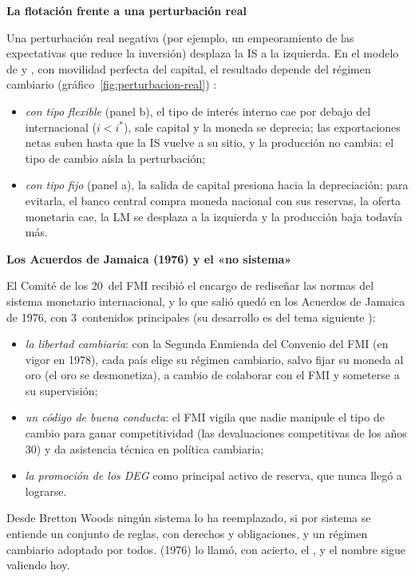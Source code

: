 \documentclass[11pt]{article}
\begin{document}
\begin{anotaciones}
\textbf{La flotación frente a una perturbación real}

Una perturbación real negativa (por ejemplo, un empeoramiento de las expectativas que reduce la inversión) desplaza la IS a la izquierda. En el modelo de  y , con movilidad perfecta del capital, el resultado depende del régimen cambiario (gráfico~\ref{fig:perturbacion-real})  :
\begin{itemize}
\item \emph{con tipo flexible} (panel b), el tipo de interés interno cae por debajo del internacional ($i<i^*$), sale capital y la moneda se deprecia; las exportaciones netas suben hasta que la IS vuelve a su sitio, y la producción no cambia: el tipo de cambio aísla la perturbación;
\item \emph{con tipo fijo} (panel a), la salida de capital presiona hacia la depreciación; para evitarla, el banco central compra moneda nacional con sus reservas, la oferta monetaria cae, la LM se desplaza a la izquierda y la producción baja todavía más.
\end{itemize}
\begin{figuracaja}
\caption{Una perturbación real negativa con tipo de cambio fijo y flexible}\label{fig:perturbacion-real}
\end{figuracaja}
\end{anotaciones}

\begin{anotaciones}
\textbf{Los Acuerdos de Jamaica (1976) y el «no sistema»}

El Comité de los 20~del FMI recibió el encargo de rediseñar las normas del sistema monetario internacional, y lo que salió quedó en los Acuerdos de Jamaica de 1976, con 3~contenidos principales (su desarrollo es del tema siguiente ):
\begin{itemize}
\item \emph{la libertad cambiaria}: con la Segunda Enmienda del Convenio del FMI (en vigor en 1978), cada país elige su régimen cambiario, salvo fijar su moneda al oro (el oro se desmonetiza), a cambio de colaborar con el FMI y someterse a su supervisión;
\item \emph{un código de buena conducta}: el FMI vigila que nadie manipule el tipo de cambio para ganar competitividad (las devaluaciones competitivas de los años 30) y da asistencia técnica en política cambiaria;
\item \emph{la promoción de los DEG} como principal activo de reserva, que nunca llegó a lograrse.
\end{itemize}
Desde Bretton Woods ningún sistema lo ha reemplazado, si por sistema se entiende un conjunto de reglas, con derechos y obligaciones, y un régimen cambiario adoptado por todos.  (1976) lo llamó, con acierto, el , y el nombre sigue valiendo hoy\nocite{Williamson1976Benefits}.
\end{anotaciones}
\end{document}
